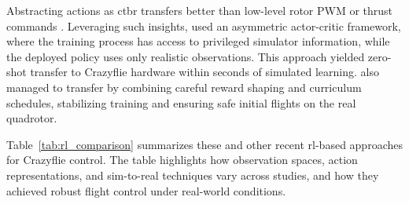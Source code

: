 Abstracting actions as \gls{ctbr} transfers better than low-level rotor PWM or thrust commands \cite{kaufmann_benchmark_2022}. Leveraging such insights, \cite{eschmann_learning_2024} used an asymmetric actor-critic framework, where the training process has access to privileged simulator information, while the deployed policy uses only realistic observations. This approach yielded zero-shot transfer to Crazyflie hardware within seconds of simulated learning. \cite{chen_what_2024} also managed to transfer by combining careful reward shaping and curriculum schedules, stabilizing training and ensuring safe initial flights on the real quadrotor.

Table~\ref{tab:rl_comparison} summarizes these and other recent \gls{rl}-based approaches for Crazyflie control. The table highlights how observation spaces, action representations, and sim-to-real techniques vary across studies, and how they achieved robust flight control under real-world conditions.
